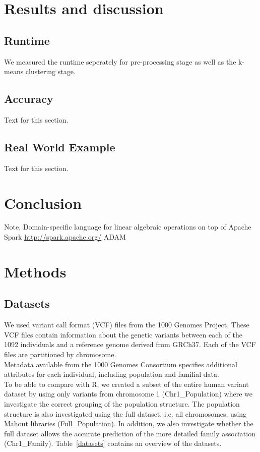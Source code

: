 \documentclass[twocolumn]{bmcart}%
\newcommand{\chrOnePop}{Chr1\_Population}
\newcommand{\FullPop}{Full\_Population}
\newcommand{\FullFam}{Chr1\_Family}
\begin{document}







\section*{Results and discussion}
\subsection*{Runtime}
We measured the runtime seperately for pre-processing stage as well as the k-means clustering stage. 

\subsection*{Accuracy}
Text for this section.

\subsection*{Real World Example}
Text for this section.

\section*{Conclusion}
Note,  Domain-specific language for linear algebraic operations on top of Apache Spark \url{http://spark.apache.org/}
ADAM~\cite{Massie2013}


\section*{Methods}
\subsection*{Datasets}
We used variant call format (VCF) files from the 1000 Genomes Project.
These VCF files contain information about the genetic variants between each of the 1092 individuals and a reference genome derived from GRCh37. 
Each of the VCF files are partitioned by chromosome.\\
Metadata available from the 1000 Genomes Consortium specifies additional attributes for each individual, including population and familial data.\\
To be able to compare with R, we created a subset of the entire human variant dataset by using only variants from chromosome 1 (\chrOnePop) where we investigate the correct grouping of the population structure. 
The population structure is also investigated using the full dataset, i.e. all chromosomes, using Mahout libraries (\FullPop). 
In addition, we also investigate whether the full dataset allows the accurate prediction of the more detailed family association (\FullFam).
Table~\ref{datasets} contains an overview of the datasets.
\end{document}
